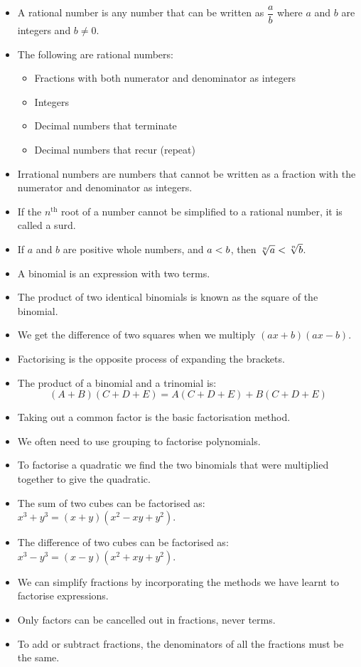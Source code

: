 

\begin{itemize}[itemsep=5pt]

\item  A rational number is any number that can be written as $\dfrac{a}{b}$
where $a$ and $b$ are integers and $b\ne 0$.
\item The following are rational numbers:
    \begin{itemize}[noitemsep]
	\item Fractions with both numerator and denominator as integers
	\item Integers
	\item Decimal numbers that terminate
	\item Decimal numbers that recur (repeat)
    \end{itemize}
\item Irrational numbers are numbers that cannot be written as a fraction with the numerator and denominator as integers.
\item If the ${n}^{\mathrm{th}}$ root of a number cannot be simplified to a rational number, it is called a surd.
\item If $a$ and $b$ are positive whole numbers, and $a<{}b$, then $\sqrt[n]{a}<{}\sqrt[n]{b}$.
\item A binomial is an expression with two terms. 
\item The product of two identical binomials is known as the square of the binomial. 
\item We get the difference of two squares when we multiply $(ax+b)(ax-b)$.
\item Factorising is the opposite process of expanding the brackets.
\item The product of a binomial and a trinomial is:
  \begin{equation}
    (A+B)(C+D+E)=A(C+D+E)+B(C+D+E)
  \end{equation}

\item Taking out a common factor is the basic factorisation method.
\item We often need to use grouping to factorise polynomials.
\item To factorise a quadratic we find the two binomials that were multiplied together to give the quadratic.
\item The sum of two cubes can be factorised as: ${x}^{3}+{y}^{3}=(x+y)({x}^{2}-xy+{y}^{2})$. 
\item The difference of two cubes can be factorised as: ${x}^{3}-{y}^{3}=(x-y)({x}^{2}+xy+{y}^{2})$.
\item We can simplify fractions by incorporating the methods we have learnt to factorise expressions.
\item Only factors can be cancelled out in fractions, never terms.
\item To add or subtract fractions, the denominators of all the fractions must be the same.

\end{itemize}


